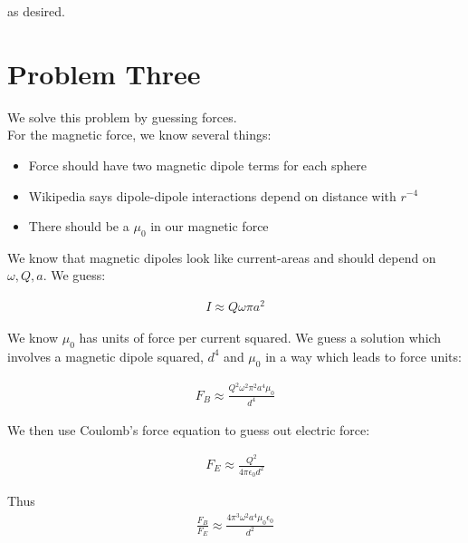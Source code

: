 \documentclass[10pt]{article} %
\begin{document}
as desired.

\section{Problem Three}

We solve this problem by guessing forces.\\

For the magnetic force, we know several things:

\begin{itemize}
\item Force should have two magnetic dipole terms for each sphere
\item Wikipedia says dipole-dipole interactions depend on distance with $r^{-4}$
\item There should be a $\mu_0$ in our magnetic force
\end{itemize}

We know that magnetic dipoles look like current-areas and should depend on $\omega, Q, a$. We guess:

\begin{align*}
	I \approx Q\omega\pi a^2
\end{align*}

We know $\mu_0$ has units of force per current squared. We guess a solution which involves a magnetic dipole squared, $d^4$ and $\mu_0$ in a way which leads to force units:

\begin{align*}
	F_B \approx \frac{Q^2\omega^2\pi^2a^4\mu_0}{d^4}
\end{align*}

We then use Coulomb's force equation to guess out electric force:

\begin{align*}
	F_E \approx \frac{Q^2}{4\pi\epsilon_0 d^2}
\end{align*}

Thus
\begin{align*}
	\frac{F_B}{F_E} \approx \frac{4\pi^3\omega^2a^4\mu_0\epsilon_0}{d^2}
\end{align*}
\end{document}
